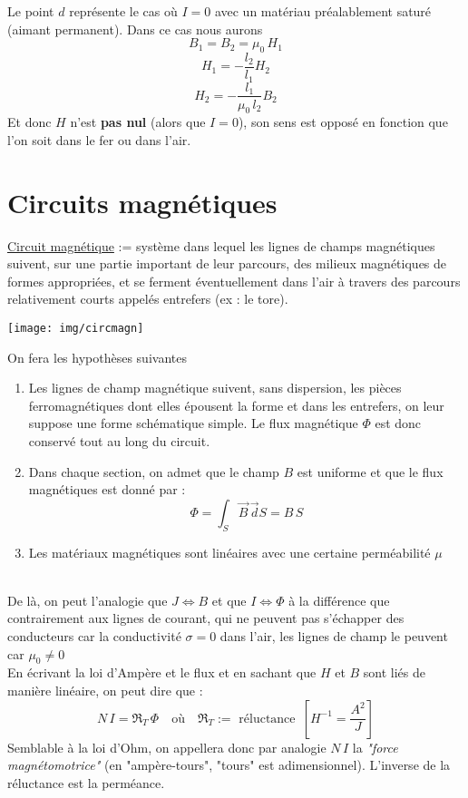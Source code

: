 \documentclass[british,french,11pt, a4paper, openany]{book}
\begin{document}
		Le point $d$ représente le cas où $I=0$ avec un matériau préalablement saturé (aimant permanent). Dans ce cas nous aurons $$B_1=B_2=\mu_0\,H_1$$\begin{equation}
		H_1=-\frac{l_2}{l_1}H_2
		\end{equation}
		$$H_2=-\frac{l_1}{\mu_0\,l_2}B_2$$ Et donc $H$ n'est \textbf{pas nul} (alors que $I=0$), son sens est opposé en fonction que l'on soit dans le fer ou dans l'air.
		\section{Circuits magnétiques}
		\underline{Circuit magnétique} := système dans lequel les lignes de champs magnétiques suivent, sur une partie important de leur parcours, des milieux magnétiques de formes appropriées, et se ferment éventuellement dans l'air à travers des parcours relativement courts appelés entrefers (ex : le tore).\\\begin{center}\texttt{[image: img/circmagn]}\end{center}
		On fera les hypothèses suivantes \begin{enumerate}
			\item Les lignes de champ magnétique suivent, sans dispersion, les pièces ferromagnétiques dont elles épousent la forme et dans les entrefers, on leur suppose une forme schématique simple. Le flux magnétique $\Phi$ est donc conservé tout au long du circuit.
			\item Dans chaque section, on admet que le champ $B$ est uniforme et que le flux magnétiques est donné par :\begin{equation}
			\Phi=\int_S\vec B\,\vec dS=B\,S
			\end{equation}
			\item Les matériaux magnétiques sont linéaires avec une certaine perméabilité $\mu$
		\end{enumerate}\ \\
		De là, on peut l'analogie que $J\Leftrightarrow B$ et que $I\Leftrightarrow \Phi$ à la différence que contrairement aux lignes de courant, qui ne peuvent pas s'échapper des conducteurs car la conductivité $\sigma=0$  dans l'air, les lignes de champ le peuvent car $\mu_0\neq 0$\\
		
		En écrivant la loi d'Ampère et le flux et en sachant que $H$ et $B$ sont liés de manière linéaire, on peut dire que : \begin{equation}\label{relcircmagn}
		N\,I=\Re_T\,\Phi\quad\text{où}\quad\Re_T:=\text{ réluctance }\,\left[H^{-1}=\frac{A^2}{J}\right]
		\end{equation}
		Semblable à la loi d'Ohm, on appellera donc par analogie $N\,I$ la \textit{"force magnétomotrice"} (en "ampère-tours", "tours" est adimensionnel). L'inverse de la réluctance est la perméance.\\
		
\end{document}
